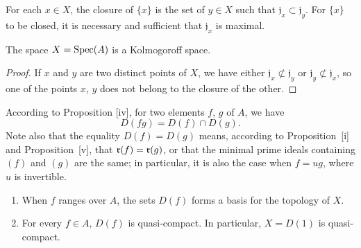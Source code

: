 \begin{corollary}[1.1.7]
\label{I.1.1.7}
For each $x\in X$, the closure of $\{x\}$ is the set of $y\in X$ such that $\mathfrak{j}_x\subset\mathfrak{j}_y$.
For $\{x\}$ to be closed, it is necessary and sufficient that $\mathfrak{j}_x$ is maximal.
\end{corollary}

\begin{corollary}[1.1.8]
\label{I.1.1.8}
The space $X=\operatorname{Spec}(A)$ is a Kolmogoroff space.
\end{corollary}

\begin{proof}
If $x$ and $y$ are two distinct points of $X$, we have either $\mathfrak{j}_x\not\subset\mathfrak{j}_y$ or $\mathfrak{j}_y\not\subset\mathfrak{j}_x$, so one of the points $x$, $y$ does not belong to the closure of the other.
\end{proof}

\begin{env}[1.1.9]
\label{I.1.1.9}
According to Proposition [iv], for two elements $f$, $g$ of $A$, we have
\[
\label{I.1.1.9.1}
  D(fg)=D(f)\cap D(g).
  \tag{1.1.9.1}
\]
Note also that the equality $D(f)=D(g)$ means, according to Proposition~[i] and Proposition~[v], that $\mathfrak{r}(f)=\mathfrak{r}(g)$, or that the minimal prime ideals containing $(f)$ and $(g)$ are the same;
in particular, it is also the case when $f=ug$, where $u$ is invertible.
\end{env}

\begin{proposition}[1.1.10]
\label{I.1.1.10}
\medskip\noindent
{}
\begin{enumerate}
  \item[{\rm(i)}] When $f$ ranges over $A$, the sets $D(f)$ forms a basis for the topology of $X$.
  \item[{\rm(ii)}] For every $f\in A$, $D(f)$ is quasi-compact.
    In particular, $X=D(1)$ is quasi-compact.
\end{enumerate}
\end{proposition}

